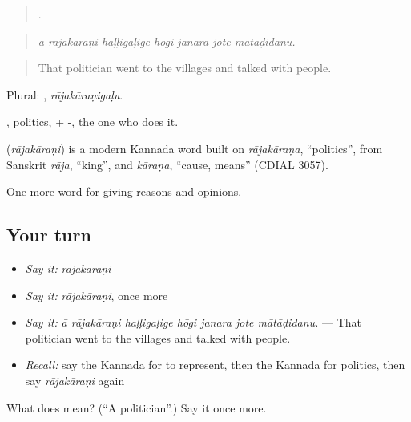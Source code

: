 \begin{quote}
      .
\end{quote}

\begin{quote}
\emph{ā rājakāraṇi haḷḷigaḷige hōgi janara jote mātāḍidanu.}
\end{quote}

\begin{quote}
That politician went to the villages and talked with people.
\end{quote}

Plural: , \emph{rājakāraṇigaḷu}.

, politics, + -, the one who does it.

\begin{cousinweb}
\textbf{} (\emph{rājakāraṇi}) is a modern Kannada word built on \emph{rājakāraṇa}, \textquotedblleft{}politics\textquotedblright{}, from Sanskrit \emph{rāja}, \textquotedblleft{}king\textquotedblright{}, and \emph{kāraṇa}, \textquotedblleft{}cause, means\textquotedblright{} (CDIAL 3057).
\end{cousinweb}

\begin{grammarlens}[title={What you've built}]
One more word for giving reasons and opinions.
\end{grammarlens}

\subsection*{Your turn}
\begin{itemize}
\raggedright
  \item \emph{Say it:} \emph{rājakāraṇi}
  \item \emph{Say it:} \emph{rājakāraṇi}, once more
  \item \emph{Say it:} \emph{ā rājakāraṇi haḷḷigaḷige hōgi janara jote mātāḍidanu.} — That politician went to the villages and talked with people.
  \item \emph{Recall:} say the Kannada for to represent, then the Kannada for politics, then say \emph{rājakāraṇi} again
\end{itemize}

\begin{tcolorbox}[breakable,colback=teal!4,colframe=teal!35!black,title={Before you move on}]
What does  mean? (\textquotedblleft{}A politician\textquotedblright{}.) Say it once more.
\end{tcolorbox}
